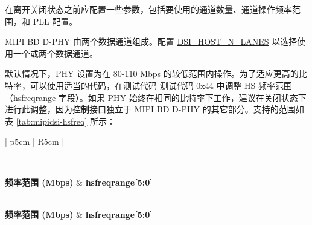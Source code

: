 \documentclass[main\_\_CN.tex]{subfiles}
\begin{document}
在离开关闭状态之前应配置一些参数，包括要使用的通道数量、通道操作频率范围，和 PLL 配置。

MIPI BD D-PHY 由两个数据通道组成。配置 \hyperref[fielddesc:DSIHOSTNLANES]{DSI\_HOST\_N\_LANES} 以选择使用一个或两个数据通道。

默认情况下，PHY 设置为在 80-110 Mbps 的较低范围内操作。为了适应更高的比特率，可以使用适当的代码，在测试代码 \hyperref[sec:test-code-0x44]{测试代码 0x44} 中调整 HS 频率范围（hsfreqrange 字段）。如果 PHY 始终在相同的比特率下工作，建议在关闭状态下进行此调整，因为控制接口独立于 MIPI BD D-PHY 的其它部分。支持的范围如表 \ref{tab:mipidsi-hsfreq} 所示：

\begin{longtable}{| p{5cm} | R{5cm} |}
    \caption{MIPI BD D-PHY 支持的频率范围} \label{tab:mipidsi-hsfreq} \\
    \hline
    
    \textbf{频率范围 (Mbps)} & \textbf{hsfreqrange[5:0]\tnote{*}} \\ \hline
    \endfirsthead

    \\\hline
    \textbf{频率范围 (Mbps)} & \textbf{hsfreqrange[5:0]\tnote{*}} \\ \hline
    \endhead

     \\
    \endfoot

    \endlastfoot
    

\end{longtable}
\end{document}
